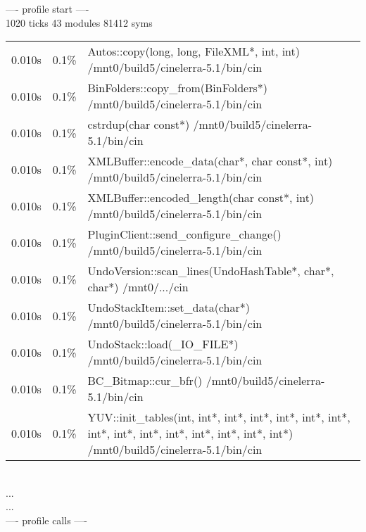 ---- profile start ----\\
1020 ticks 43 modules 81412 syms\\
\begin{tabular}{@{}rrp{\linewidth-6em}}
 0.010s & 0.1\% & Autos::copy(long, long, FileXML*, int, int) /mnt0/build5/cinelerra-5.1/bin/cin\\
 0.010s & 0.1\% & BinFolders::copy\_from(BinFolders*) /mnt0/build5/cinelerra-5.1/bin/cin\\
 0.010s & 0.1\% & cstrdup(char const*)     /mnt0/build5/cinelerra-5.1/bin/cin\\
 0.010s & 0.1\% & XMLBuffer::encode\_data(char*, char const*, int) /mnt0/build5/cinelerra-5.1/bin/cin\\
 0.010s & 0.1\% & XMLBuffer::encoded\_length(char const*, int) /mnt0/build5/cinelerra-5.1/bin/cin\\
 0.010s & 0.1\% & PluginClient::send\_configure\_change() /mnt0/build5/cinelerra-5.1/bin/cin\\
 0.010s & 0.1\% & UndoVersion::scan\_lines(UndoHashTable*, char*, char*) /mnt0/.../cin\\
 0.010s & 0.1\% & UndoStackItem::set\_data(char*) /mnt0/build5/cinelerra-5.1/bin/cin\\
 0.010s & 0.1\% & UndoStack::load(\_IO\_FILE*) /mnt0/build5/cinelerra-5.1/bin/cin\\
 0.010s & 0.1\% & BC\_Bitmap::cur\_bfr()     /mnt0/build5/cinelerra-5.1/bin/cin\\
 0.010s & 0.1\% & YUV::init\_tables(int, int*, int*, int*, int*, int*, int*, int*, int*, int*, int*, int*, int*, int*, int*) /mnt0/build5/cinelerra-5.1/bin/cin\\
\end{tabular}\\
...\\
...\\
---- profile calls ----\\
